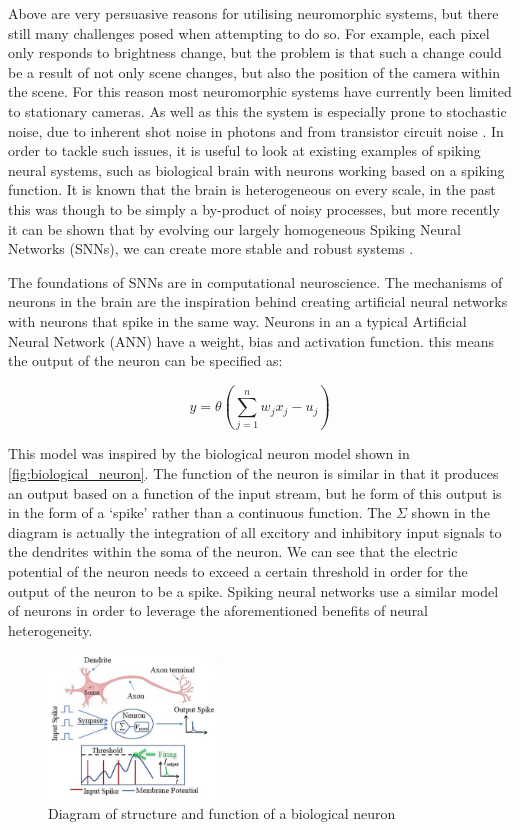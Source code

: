 Above are very persuasive reasons for utilising neuromorphic systems, but there still many challenges posed when attempting to do so. For example, each pixel only responds to brightness change, but the problem is that such a change could be a result of not only scene changes, but also the position of the camera within the scene. For this reason most neuromorphic systems have currently been limited to stationary cameras. As well as this the system is especially prone to stochastic noise, due to inherent shot noise in photons and from transistor circuit noise \cite{EventBasedVisionASurvery}. In order to tackle such issues, it is useful to look at existing examples of spiking neural systems, such as biological brain with neurons working based on a spiking function. It is known that the brain is heterogeneous on every scale, in the past this was though to be simply a by-product of noisy processes, but more recently it can be shown that by evolving our largely homogeneous Spiking Neural Networks (SNNs), we can create more stable and robust systems \cite{NeuralHetroPromRobLearn}.

The foundations of SNNs are in computational neuroscience. The mechanisms of neurons in the brain are the inspiration behind creating artificial neural networks with neurons that spike in the same way. Neurons in an a typical Artificial Neural Network (ANN) have a weight, bias and activation function. this means the output of the neuron can be specified as:

$$ y = \theta(\sum^n_{j=1}w_jx_j-u_j) $$

This model was inspired by the biological neuron model shown in \autoref{fig:biological_neuron}. The function of the neuron is similar in that it produces an output based on a function of the input stream, but he form of this output is in the form of a `spike' rather than a continuous function. The $ \Sigma $ shown in the diagram is actually the integration of all excitory and inhibitory input signals to the dendrites within the soma of the neuron. We can see that the electric potential of the neuron needs to exceed a certain threshold in order for the output of the neuron to be a spike. Spiking neural networks use a similar model of neurons in order to leverage the aforementioned benefits of neural heterogeneity.

\begin{figure}[htb]
      \centering
      \includegraphics[width=0.4\textwidth]{background/images/biological_neuron.png}
      \caption{Diagram of structure and function of a biological neuron \cite{BiologicalNeuronModel}}
      \label{fig:biological_neuron}
\end{figure}

